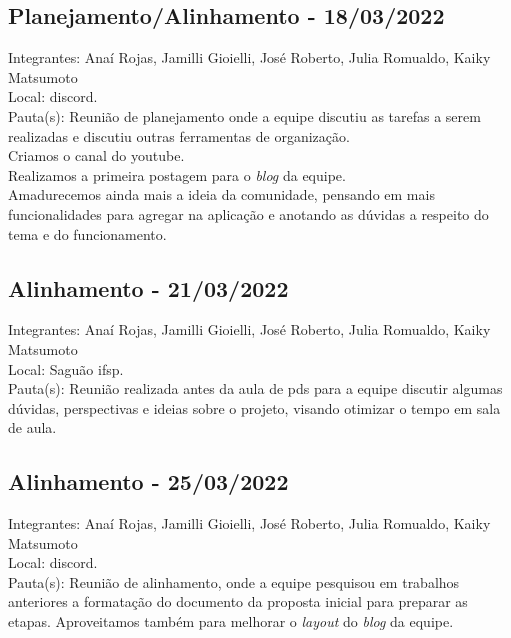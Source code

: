 \subsection{Planejamento/Alinhamento - 18/03/2022}
\noindent Integrantes: Anaí Rojas, Jamilli Gioielli, José Roberto, Julia Romualdo, Kaiky Matsumoto \\
Local: \gls{discord}.\\
Pauta(s): Reunião de planejamento onde a equipe discutiu as tarefas a serem realizadas e discutiu outras ferramentas de organização. \\
Criamos o canal do \gls{youtube}.\\
Realizamos a primeira postagem para o \textsl{blog} da equipe.\\
Amadurecemos ainda mais a ideia da comunidade, pensando em mais funcionalidades para agregar na aplicação e anotando as dúvidas a respeito do tema e do funcionamento.

\subsection{Alinhamento - 21/03/2022}
\noindent Integrantes: Anaí Rojas, Jamilli Gioielli, José Roberto, Julia Romualdo, Kaiky Matsumoto \\
Local: Saguão \acs{ifsp}.\\
Pauta(s): Reunião realizada antes da aula de \acs{pds} para a equipe discutir algumas dúvidas, perspectivas e ideias sobre o projeto, visando otimizar o tempo em sala de aula.

\subsection{Alinhamento - 25/03/2022}
\noindent Integrantes: Anaí Rojas, Jamilli Gioielli, José Roberto, Julia Romualdo, Kaiky Matsumoto \\
Local: \gls{discord}.\\
Pauta(s): Reunião de alinhamento, onde a equipe pesquisou em trabalhos anteriores a formatação do documento da proposta inicial para preparar as etapas. 
Aproveitamos também para melhorar o \textsl{layout} do \textsl{blog} da equipe.

